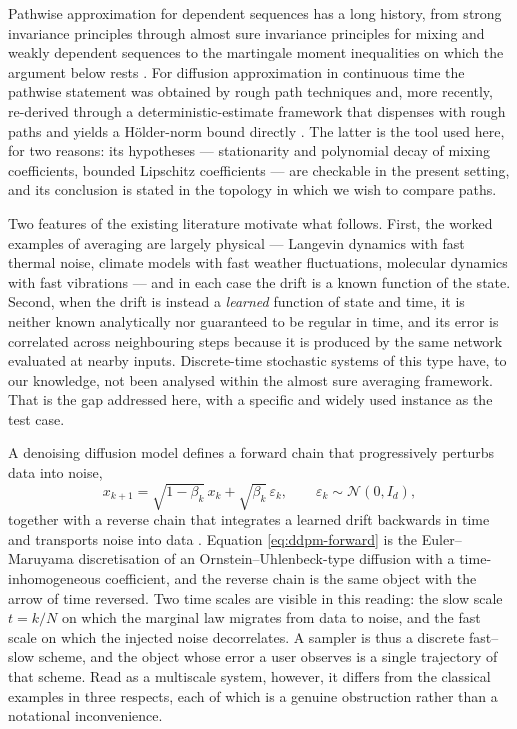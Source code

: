 \documentclass[a4paper,fleqn]{cas-dc}
\theoremstyle{definition}
\begin{document}
Pathwise approximation for dependent sequences has a long history, from strong
invariance principles \citep{strassen1964} through almost sure invariance principles
for mixing and weakly dependent sequences \citep{philipp1975,berkes1979,bradley2005,
wu2005} to the martingale moment inequalities on which the argument below rests
\citep{hall1980}. For diffusion approximation in continuous time the pathwise
statement was obtained by rough path techniques \citep{friz2024} and, more recently,
re-derived through a deterministic-estimate framework that dispenses with rough paths
and yields a H\"older-norm bound directly \citep{kifer2025}. The latter is the tool
used here, for two reasons: its hypotheses --- stationarity and polynomial decay of
mixing coefficients, bounded Lipschitz coefficients --- are checkable in the present
setting, and its conclusion is stated in the topology in which we wish to compare
paths.

Two features of the existing literature motivate what follows. First, the worked
examples of averaging are largely physical --- Langevin dynamics with fast
thermal noise, climate models with fast weather fluctuations, molecular dynamics with fast
vibrations --- and in each case the drift is a known function of the state. Second,
when the drift is instead a \emph{learned} function of state and time, it is neither
known analytically nor guaranteed to be regular in time, and its error is correlated
across neighbouring steps because it is produced by the same network evaluated at
nearby inputs. Discrete-time stochastic systems of this type have, to our knowledge,
not been analysed within the almost sure averaging framework. That is the gap
addressed here, with a specific and widely used instance as the test case.

A denoising diffusion model defines a forward chain that progressively perturbs data
into noise,
\begin{equation}
x_{k+1} = \sqrt{1-\beta_{k}}\,x_{k} + \sqrt{\beta_{k}}\,\varepsilon_{k},
\qquad \varepsilon_{k}\sim\mathcal{N}(0,I_{d}),
\label{eq:ddpm-forward}
\end{equation}
together with a reverse chain that integrates a learned drift backwards in time and
transports noise into data \citep{sohl2015,ho2020,song2021sde}. Equation
\eqref{eq:ddpm-forward} is the Euler--Maruyama discretisation of an
Ornstein--Uhlenbeck-type diffusion with a time-inhomogeneous coefficient, and the
reverse chain is the same object with the arrow of time reversed. Two time scales are
visible in this reading: the slow scale $t=k/N$ on which the marginal law migrates
from data to noise, and the fast scale on which the injected noise decorrelates. A
sampler is thus a discrete fast--slow scheme, and the object whose error a user
observes is a single trajectory of that scheme. Read as a multiscale system, however,
it differs from the classical examples in three respects, each of which is a genuine
obstruction rather than a notational inconvenience.
\end{document}
